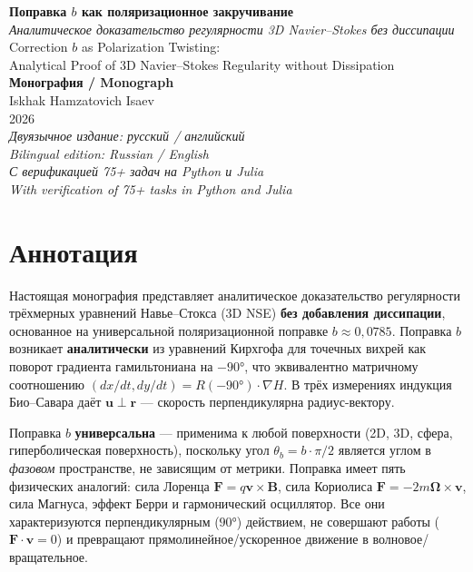 \documentclass[11pt,a4paper,twoside]{article}
\theoremstyle{remark}
\begin{document}
\begin{titlepage}
\centering
\vspace*{2cm}

{\Huge\color{accent}\textbf{Поправка \texorpdfstring{$b$}{b} как поляризационное закручивание}}\\[0.5cm]

{\Large\color{accent!80!black}\textit{Аналитическое доказательство регулярности 3D Navier--Stokes без диссипации}}\\[2cm]

{\large\color{accent}Correction $b$ as Polarization Twisting:\\
Analytical Proof of 3D Navier--Stokes Regularity without Dissipation}\\[3cm]

{\large\textbf{Монография / Monograph}}\\[1cm]

{\large Iskhak Hamzatovich Isaev}\\[0.3cm]
{\large 2026}\\[2cm]

{\small\itshape Двуязычное издание: русский / английский\\
Bilingual edition: Russian / English}\\[1cm]

{\small\itshape С верификацией 75+ задач на Python и Julia\\
With verification of 75+ tasks in Python and Julia}

\end{titlepage}

\section*{Аннотация}

Настоящая монография представляет аналитическое доказательство регулярности трёхмерных уравнений Навье--Стокса (3D NSE) \textbf{без добавления диссипации}, основанное на универсальной поляризационной поправке $b \approx 0{,}0785$. Поправка $b$ возникает \textbf{аналитически} из уравнений Кирхгофа для точечных вихрей как поворот градиента гамильтониана на $-90°$, что эквивалентно матричному соотношению $(dx/dt, dy/dt) = R(-90°)\cdot\nabla H$. В трёх измерениях индукция Био--Савара даёт $\mathbf{u}\perp\mathbf{r}$ --- скорость перпендикулярна радиус-вектору.

Поправка $b$ \textbf{универсальна} --- применима к любой поверхности (2D, 3D, сфера, гиперболическая поверхность), поскольку угол $\theta_b = b\cdot\pi/2$ является углом в \emph{фазовом} пространстве, не зависящим от метрики. Поправка имеет пять физических аналогий: сила Лоренца $\mathbf{F} = q\mathbf{v}\times\mathbf{B}$, сила Кориолиса $\mathbf{F} = -2m\boldsymbol{\Omega}\times\mathbf{v}$, сила Магнуса, эффект Берри и гармонический осциллятор. Все они характеризуются перпендикулярным ($90°$) действием, не совершают работы ($\mathbf{F}\cdot\mathbf{v} = 0$) и превращают прямолинейное/ускоренное движение в волновое/вращательное.
\end{document}
